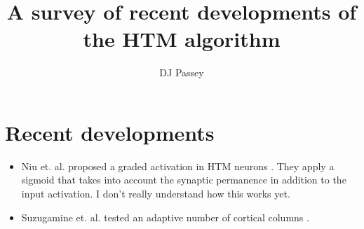 \documentclass{article}
\begin{document}
\title{A survey of recent developments of the HTM algorithm}
\author{DJ Passey}
\maketitle

\section*{Recent developments}
\begin{itemize}
\item Niu et. al. proposed a graded activation in HTM neurons \cite{Niu2022}. They apply a sigmoid that takes into account the synaptic permanence in addition to the input activation. I don't really understand how this works yet.

\item Suzugamine et. al. tested an adaptive number of cortical columns \cite{Suzugamine2020}.
\end{itemize}



\end{document}
